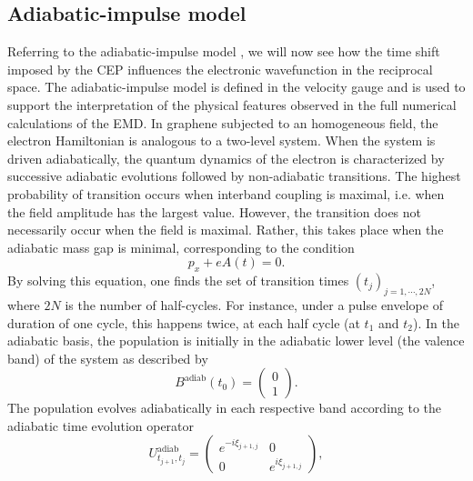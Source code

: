 \documentclass[9pt,twocolumn,twoside]{osajnl}
\begin{document}
\subsection{Adiabatic-impulse model}

Referring to the adiabatic-impulse model \cite{PhysRevB.94.125423,Shevchenko20101}, we will now see how the time shift imposed by the CEP influences the electronic wavefunction in the reciprocal space. The adiabatic-impulse model is defined in the velocity gauge and is used  to support the interpretation of the physical features observed in the full numerical calculations of the EMD. %
 In graphene subjected to an homogeneous field, the electron Hamiltonian is analogous to a two-level system. When the system is driven adiabatically, the quantum dynamics of the electron is characterized by successive adiabatic evolutions followed by non-adiabatic transitions. The highest probability of transition occurs when interband coupling is maximal, i.e. when the field amplitude has the largest value. However, the transition does not necessarily occur when the field is maximal. Rather, this takes place when the adiabatic mass gap is minimal, corresponding to the condition
 \begin{equation}\label{condition_zero}
p_x + e A(t) = 0.
\end{equation}
By solving this equation, one  finds the set of transition times $(t_{j})_{j=1,\cdots,2N}$, where $2N$ is the number of half-cycles. For instance, under a pulse envelope of duration of one cycle, this happens twice, at each half cycle (at $t_1$ and $t_{2}$).
In the adiabatic basis,  the population is initially in the adiabatic lower level (the valence band)  of the system as described by
\begin{equation}\label{Prob_init}
	B^{\mathrm{adiab}}(t_0)=
	\begin{pmatrix}
		0 \\ 1
	\end{pmatrix}.
\end{equation}
The population evolves adiabatically in each respective band according to the adiabatic time evolution operator
\begin{equation}\label{matrix_adiab}
	U^{\mathrm{adiab}}_{t_{j+1},t_j}=
	\begin{pmatrix}
		e^{-i\xi_{j+1,j}} & 0 \\ 0 & e^{i\xi_{j+1,j}}
	\end{pmatrix},
\end{equation}
\end{document}
